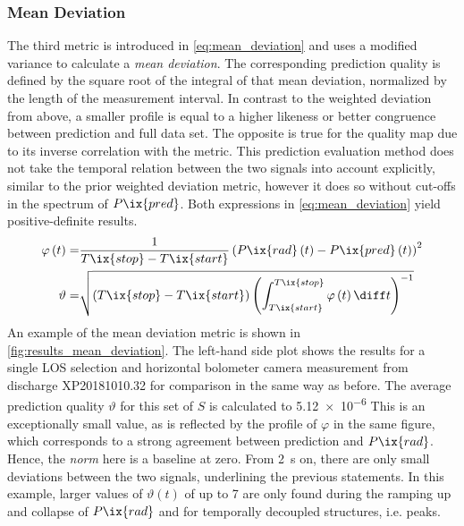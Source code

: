             \subsubsection*{Mean Deviation}%
%
                The third metric is introduced in \cref{eq:mean_deviation} and uses a modified variance to calculate a \textit{mean deviation}. The corresponding prediction quality is defined by the square root of the integral of that mean deviation, normalized by the length of the measurement interval. In contrast to the weighted deviation from above, a smaller profile is equal to a higher likeness or better congruence between prediction and full data set. The opposite is true for the quality map due to its inverse correlation with the metric. This prediction evaluation method does not take the temporal relation between the two signals into account explicitly, similar to the prior weighted deviation metric, however it does so without cut-offs in the spectrum of $P\ix{pred}$. Both expressions in \cref{eq:mean_deviation} yield positive-definite results.%
%
                \begin{align}%
                    \begin{split}\label{eq:mean_deviation}%
                        \varphi\left(t\right)=&\frac{1}{T\ix{stop}-T\ix{start}}\left(P\ix{rad}\left(t\right)-P\ix{pred}\left(t\right)\right)^{2}\\%
                        \vartheta=&\sqrt{\left(T\ix{stop}-T\ix{start}\right)\left(\int_{T\ix{start}}^{T\ix{stop}}\varphi\left(t\right)\diff t\right)^{-1}}%
                    \end{split}%
                \end{align}%
%
                An example of the mean deviation metric is shown in \cref{fig:results_mean_deviation}. The left-hand side plot shows the results for a single LOS selection and horizontal bolometer camera measurement from discharge XP20181010.32 for comparison in the same way as before. The average prediction quality $\vartheta$ for this set of $S$ is calculated to \SI{5.12e-6}{\arbitraryunit} This is an exceptionally small value, as is reflected by the profile of $\varphi$ in the same figure, which corresponds to a strong agreement between prediction and $P\ix{rad}$. Hence, the \textit{norm} here is a baseline at zero. From \SI{2}{\second} on, there are only small deviations between the two signals, underlining the previous statements. In this example, larger values of $\vartheta\left(t\right)$ of up to \SI{7}{\arbitraryunit} are only found during the ramping up and collapse of $P\ix{rad}$ and for temporally decoupled structures, i.e. peaks.\\%
